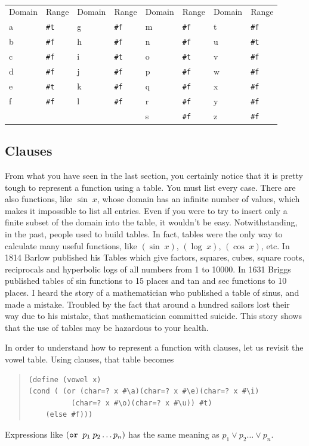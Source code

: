 \documentclass[a4paper,12pt]{book}
\begin{document}
\verb||\\
{\footnotesize
\begin{tabular}{|p{1.2cm} p{1.2cm} | p{1.2cm} p{1.2cm} |p{1.2cm} p{1.2cm} | p{1.2cm} p{1.2cm} |}
Domain & Range & Domain & Range & Domain & Range & Domain & Range\\
a & \verb|#t| & g &\verb|#f| & m &\verb|#f| & t & \verb|#f| \\
b & \verb|#f| & h &\verb|#f| & n & \verb|#f| & u & \verb|#t| \\
c & \verb|#f| &  i &\verb|#t| &o &\verb|#t| & v & \verb|#f|\\
d &\verb|#f| &  j & \verb|#f| & p & \verb|#f| & w & \verb|#f| \\
e &\verb|#t| & k & \verb|#f| & q & \verb|#f| & x & \verb|#f| \\
f &\verb|#f| &  l &\verb|#f| & r & \verb|#f| & y & \verb|#f| \\
&            &                 &  & s & \verb|#f| & z & \verb|#f|\\
\end{tabular}}

\subsection{Clauses}
From what you have seen in the last section, you certainly notice that it is pretty tough to represent a
function using a table. You must list every case. There are also functions,
like $\sin\;x$, whose domain has an infinite number of values, which makes
it impossible to list all entries. 
Even if you were to try to insert only a finite
subset of the domain into the table, it wouldn't be easy. 
Notwithstanding, in the past,
people used to build tables. In fact, tables were the only way to calculate many
useful functions, like $(\sin\;x)$, 
$(\log\;x)$, $(\cos\;x)$, etc. In 1814 Barlow
published his Tables which give factors, squares, cubes, square roots, reciprocals
and hyperbolic logs of all numbers from 1 to 10000. In 1631 Briggs published
tables of sin functions to 15 places and tan and sec functions to 10 places.
I heard the story of a mathematician who published a table of sinus, and made
a mistake. Troubled by the fact that around a hundred sailors lost their way due to his
mistake, that mathematician committed suicide. This story shows that the use
of tables may be hazardous to your health.

In order to understand how to represent a function with clauses, let us revisit the vowel table.
Using clauses, that table becomes
\begin{quote}\small
\begin{verbatim}
(define (vowel x)
(cond ( (or (char=? x #\a)(char=? x #\e)(char=? x #\i) 
          (char=? x #\o)(char=? x #\u)) #t)
    (else #f)))
\end{verbatim}
\end{quote}
Expressions like $(\verb|or | p_1\;p_2\ldots p_n)$ has the same 
meaning as $p_1 \vee p_2\ldots \vee p_n$.
\end{document}
